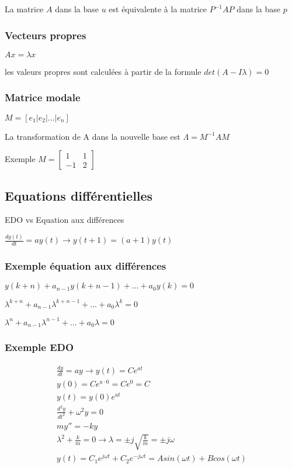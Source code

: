 \documentclass[resume]{subfiles}
\begin{document}
La matrice $A$ dans la base $u$ est équivalente à la matrice
$P^{-1}AP$ dans la base $p$  

\subsubsection{Vecteurs propres}

$Ax = \lambda x$ 

les valeurs propres sont calculées à partir de la formule $det(A-I\lambda) = 0$ 

\subsubsection{Matrice modale}

$M =[e_1|e_2|...|e_n]$ 

La transformation de A dans la nouvelle base est $\Lambda=M^{-1}AM$ 

Exemple $M=\begin{bmatrix} 1 & 1 \\ -1 & 2 \end{bmatrix}$ 

\subsection{Equations différentielles}

EDO vs Equation aux différences

$\frac{dy(t)}{dt} = ay(t) \rightarrow y(t+1)=(a+1)y(t)$ 

\subsubsection{Exemple équation aux différences}

$y(k + n) + a_{n-1}y(k + n-1) +...+ a_0y(k) = 0$

$\lambda^{k+n} + a_{n-1}\lambda^{k+n-1} + . . . + a_0\lambda^k = 0$ 

$\lambda^{n} + a_{n-1}\lambda^{n-1} + . . . + a_0\lambda = 0$ 

\subsubsection{Exemple EDO}
\begin{multline*}
\frac{dy}{dt} = ay \rightarrow y(t) = Ce^{at}\\
y(0) = Ce^{a\cdot 0} = Ce^0 = C\\
y(t) = y(0)e^{at}\\
\frac{d^2y}{dt^2} + \omega^2y = 0\\
my'' = -ky\\
\lambda^2 + \frac{k}{m}=0 \rightarrow \lambda = \pm j\sqrt{\frac{k}{m}}=\pm j\omega\\
y(t)=C_1 e^{j\omega t}+C_2 e^{-j\omega t} = Asin(\omega t)+Bcos(\omega t)
\end{multline*}
\end{document}
